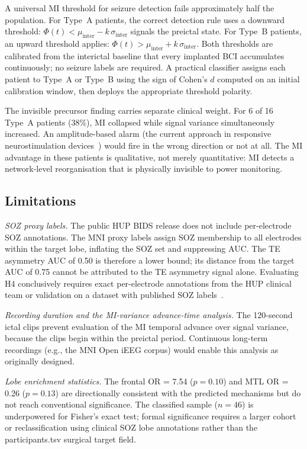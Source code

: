 \documentclass[a4paper,fleqn]{cas-dc}
\begin{document}
A universal MI threshold for seizure detection fails approximately half
the population.
%
For Type~A patients, the correct detection rule uses a downward
threshold: $\Phi(t) < \mu_{\text{inter}} - k\,\sigma_{\text{inter}}$
signals the preictal state.
%
For Type~B patients, an upward threshold applies:
$\Phi(t) > \mu_{\text{inter}} + k\,\sigma_{\text{inter}}$.
%
Both thresholds are calibrated from the interictal baseline that every
implanted BCI accumulates continuously; no seizure labels are required.
%
A practical classifier assigns each patient to Type~A or Type~B using
the sign of Cohen's $d$ computed on an initial calibration window, then
deploys the appropriate threshold polarity.

The invisible precursor finding carries separate clinical weight.
%
For 6 of 16 Type~A patients (38\%), MI collapsed while signal variance
simultaneously increased.
%
An amplitude-based alarm (the current approach in responsive
neurostimulation devices~\citep{bergey2015}) would fire in the wrong
direction or not at all.
%
The MI advantage in these patients is qualitative, not merely
quantitative: MI detects a network-level reorganisation that is
physically invisible to power monitoring.

\subsection{Limitations}
\label{sec:limitations}

\textit{SOZ proxy labels.}
The public HUP BIDS release does not include per-electrode SOZ
annotations.
%
The MNI proxy labels assign SOZ membership to all electrodes within the
target lobe, inflating the SOZ set and suppressing AUC.
%
The TE asymmetry AUC of 0.50 is therefore a lower bound; its distance
from the target AUC of 0.75 cannot be attributed to the TE asymmetry
signal alone.
%
Evaluating H4 conclusively requires exact per-electrode annotations
from the HUP clinical team or validation on a dataset with published
SOZ labels~\citep{wagenaar2015}.

\textit{Recording duration and the MI-variance advance-time analysis.}
The 120-second ictal clips prevent evaluation of the MI temporal
advance over signal variance, because the clips begin within the
preictal period.
%
Continuous long-term recordings (e.g., the MNI Open iEEG corpus) would
enable this analysis as originally designed.

\textit{Lobe enrichment statistics.}
The frontal OR = 7.54 ($p = 0.10$) and MTL OR = 0.26 ($p = 0.13$) are
directionally consistent with the predicted mechanisms but do not reach
conventional significance.
%
The classified sample ($n = 46$) is underpowered for Fisher's exact
test; formal significance requires a larger cohort or reclassification
using clinical SOZ lobe annotations rather than the participants.tsv
surgical target field.
\end{document}

